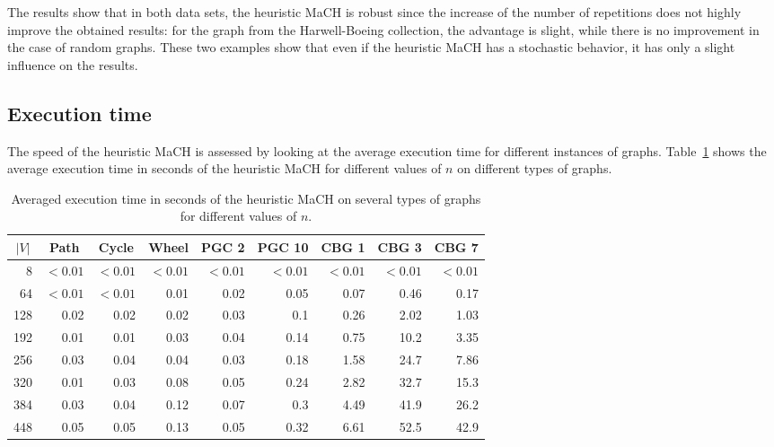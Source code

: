 \documentclass{scrartcl}
\theoremstyle{plain}
\newcommand{\algo}{MaCH}
\begin{document}
The results show that in both data sets, the heuristic \algo{} is robust since 
the increase of the number of repetitions does not highly improve the obtained 
results: for the graph from the Harwell-Boeing collection, the advantage is 
slight, while there is no improvement in the case of random graphs. These two 
examples show that even if the heuristic \algo{} has a stochastic behavior, it 
has only a slight influence on the results. 


\subsection{Execution time}

The speed of the heuristic \algo{} is assessed by looking at the average 
execution time for different instances of graphs. Table~\ref{tab:time_standard} 
shows the average execution time in seconds of the heuristic \algo{} for 
different values of $n$ on different types of graphs.
\begin{table}[!ht]
	\centering
	\small
	\begin{tabular}{|r|rrrrrrrr|}
		\hline
		\multicolumn{1}{|c|}{$|V|$} &
		\multicolumn{1}{c}{Path} & 
		\multicolumn{1}{c}{Cycle} & 
		\multicolumn{1}{c}{Wheel} & 
		\multicolumn{1}{c}{PGC 2} & 
		\multicolumn{1}{c}{PGC 10} & 
		\multicolumn{1}{c}{CBG 1} & 
		\multicolumn{1}{c}{CBG 3} & 
		\multicolumn{1}{c|}{CBG 7} \\ \hline

		\makeatletter{}8 & $<0.01$& $<0.01$& $<0.01$& $<0.01$& $<0.01$& $<0.01$& $<0.01$& $<0.01$\\ 
64 & $<0.01$& $<0.01$& 0.01 & 0.02 & 0.05 & 0.07 & 0.46 & 0.17 \\ 
128 & 0.02 & 0.02 & 0.02 & 0.03 & 0.1 & 0.26 & 2.02 & 1.03 \\ 
192 & 0.01 & 0.01 & 0.03 & 0.04 & 0.14 & 0.75 & 10.2 & 3.35 \\ 
256 & 0.03 & 0.04 & 0.04 & 0.03 & 0.18 & 1.58 & 24.7 & 7.86 \\ 
320 & 0.01 & 0.03 & 0.08 & 0.05 & 0.24 & 2.82 & 32.7 & 15.3 \\ 
384 & 0.03 & 0.04 & 0.12 & 0.07 & 0.3 & 4.49 & 41.9 & 26.2 \\ 
448 & 0.05 & 0.05 & 0.13 & 0.05 & 0.32 & 6.61 & 52.5 & 42.9 \\  

		\hline
	\end{tabular}
	\caption{\label{tab:time_standard}Averaged execution time in seconds of 
the heuristic \algo{} on several types of graphs for different values of $n$.}

\end{table}
\end{document}
